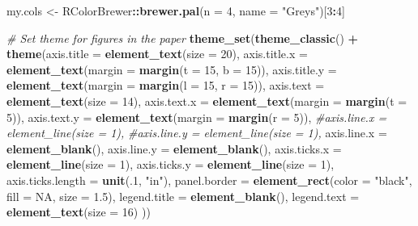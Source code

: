 \documentclass[]{article}
\newenvironment{Shaded}{\begin{snugshade}}{\end{snugshade}}
\newcommand{\KeywordTok}[1]{\textcolor[rgb]{0.13,0.29,0.53}{\textbf{#1}}}
\newcommand{\DataTypeTok}[1]{\textcolor[rgb]{0.13,0.29,0.53}{#1}}
\newcommand{\DecValTok}[1]{\textcolor[rgb]{0.00,0.00,0.81}{#1}}
\newcommand{\FloatTok}[1]{\textcolor[rgb]{0.00,0.00,0.81}{#1}}
\newcommand{\StringTok}[1]{\textcolor[rgb]{0.31,0.60,0.02}{#1}}
\newcommand{\CommentTok}[1]{\textcolor[rgb]{0.56,0.35,0.01}{\textit{#1}}}
\newcommand{\OtherTok}[1]{\textcolor[rgb]{0.56,0.35,0.01}{#1}}
\newcommand{\OperatorTok}[1]{\textcolor[rgb]{0.81,0.36,0.00}{\textbf{#1}}}
\newcommand{\NormalTok}[1]{#1}
\begin{document}
\begin{Shaded}
\begin{Highlighting}[]
\NormalTok{my.cols <-}\StringTok{ }\NormalTok{RColorBrewer}\OperatorTok{::}\KeywordTok{brewer.pal}\NormalTok{(}\DataTypeTok{n =} \DecValTok{4}\NormalTok{, }\DataTypeTok{name =} \StringTok{"Greys"}\NormalTok{)[}\DecValTok{3}\OperatorTok{:}\DecValTok{4}\NormalTok{]}

\CommentTok{# Set theme for figures in the paper}
\KeywordTok{theme_set}\NormalTok{(}\KeywordTok{theme_classic}\NormalTok{() }\OperatorTok{+}\StringTok{ }
\StringTok{  }\KeywordTok{theme}\NormalTok{(}\DataTypeTok{axis.title =} \KeywordTok{element_text}\NormalTok{(}\DataTypeTok{size =} \DecValTok{20}\NormalTok{),}
        \DataTypeTok{axis.title.x =} \KeywordTok{element_text}\NormalTok{(}\DataTypeTok{margin =} \KeywordTok{margin}\NormalTok{(}\DataTypeTok{t =} \DecValTok{15}\NormalTok{, }\DataTypeTok{b =} \DecValTok{15}\NormalTok{)),}
        \DataTypeTok{axis.title.y =} \KeywordTok{element_text}\NormalTok{(}\DataTypeTok{margin =} \KeywordTok{margin}\NormalTok{(}\DataTypeTok{l =} \DecValTok{15}\NormalTok{, }\DataTypeTok{r =} \DecValTok{15}\NormalTok{)),}
        \DataTypeTok{axis.text =} \KeywordTok{element_text}\NormalTok{(}\DataTypeTok{size =} \DecValTok{14}\NormalTok{),}
        \DataTypeTok{axis.text.x =} \KeywordTok{element_text}\NormalTok{(}\DataTypeTok{margin =} \KeywordTok{margin}\NormalTok{(}\DataTypeTok{t =} \DecValTok{5}\NormalTok{)),}
        \DataTypeTok{axis.text.y =} \KeywordTok{element_text}\NormalTok{(}\DataTypeTok{margin =} \KeywordTok{margin}\NormalTok{(}\DataTypeTok{r =} \DecValTok{5}\NormalTok{)),}
        \CommentTok{#axis.line.x = element_line(size = 1),}
        \CommentTok{#axis.line.y = element_line(size = 1),}
        \DataTypeTok{axis.line.x =} \KeywordTok{element_blank}\NormalTok{(),}
        \DataTypeTok{axis.line.y =} \KeywordTok{element_blank}\NormalTok{(),}
        \DataTypeTok{axis.ticks.x =} \KeywordTok{element_line}\NormalTok{(}\DataTypeTok{size =} \DecValTok{1}\NormalTok{),}
        \DataTypeTok{axis.ticks.y =} \KeywordTok{element_line}\NormalTok{(}\DataTypeTok{size =} \DecValTok{1}\NormalTok{),}
        \DataTypeTok{axis.ticks.length =} \KeywordTok{unit}\NormalTok{(.}\DecValTok{1}\NormalTok{, }\StringTok{"in"}\NormalTok{),}
        \DataTypeTok{panel.border =} \KeywordTok{element_rect}\NormalTok{(}\DataTypeTok{color =} \StringTok{"black"}\NormalTok{, }\DataTypeTok{fill =} \OtherTok{NA}\NormalTok{, }\DataTypeTok{size =} \FloatTok{1.5}\NormalTok{),}
        \DataTypeTok{legend.title =} \KeywordTok{element_blank}\NormalTok{(),}
        \DataTypeTok{legend.text =} \KeywordTok{element_text}\NormalTok{(}\DataTypeTok{size =} \DecValTok{16}\NormalTok{)}
\NormalTok{        ))}
\end{Highlighting}
\end{Shaded}
\end{document}
